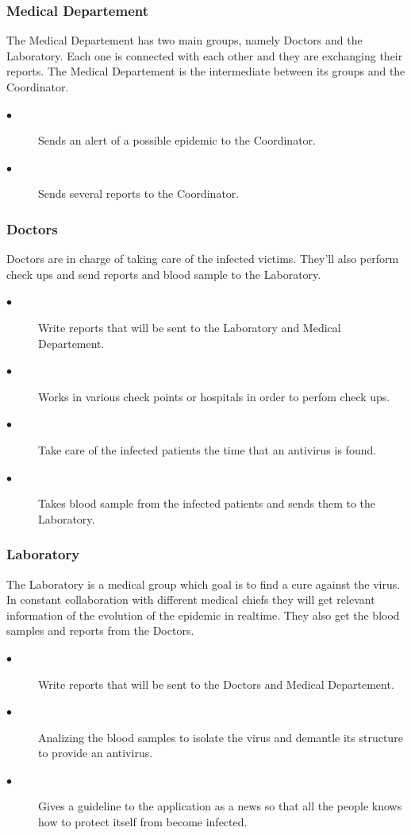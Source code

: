 \subsubsection{Medical Departement}
The Medical Departement has two main groups, namely Doctors and the Laboratory.
Each one is connected with each other and they are exchanging their reports. The
Medical Departement is the intermediate between its groups and the Coordinator.
\begin{description}
 \item[$\bullet$] Sends an alert of a possible epidemic to the Coordinator.
 \item[$\bullet$] Sends several reports to the Coordinator.
\end{description} 

\subsubsection{Doctors}
Doctors are in charge of taking care of the infected victims. They'll also
perform check ups and send reports and blood sample to the Laboratory.
\begin{description}
 \item[$\bullet$] Write reports that will be sent to the Laboratory and Medical
 Departement.
 \item[$\bullet$] Works in various check points or hospitals in order to perfom
 check ups.
 \item[$\bullet$] Take care of the infected patients the time that an antivirus
 is found.
 \item[$\bullet$] Takes blood sample from the infected patients and sends them
 to the Laboratory.
\end{description} 

\subsubsection{Laboratory}
The Laboratory is a medical group which goal is to find a cure against the
virus. In constant collaboration with different medical chiefs they will get
relevant information of the evolution of the epidemic in realtime. They also get the
blood samples and reports from the Doctors.
\begin{description}
 \item[$\bullet$] Write reports that will be sent to the Doctors and Medical
 Departement.
 \item[$\bullet$] Analizing the blood samples to isolate the virus and demantle
 its structure to provide an antivirus.
 \item[$\bullet$] Gives a guideline to the application as a news so that all the
 people knows how to protect itself from become infected.
\end{description} 

